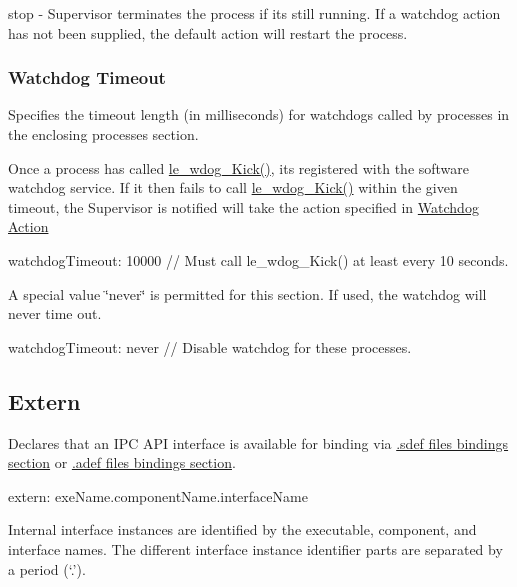 {\ttfamily stop} -\/ Supervisor terminates the process if it\textquotesingle{}s still running. If a watchdog action has not been supplied, the default action will restart the process.\hypertarget{def_files_adef_defFilesAdef_processWatchdogTimeout}{}\subsubsection{Watchdog Timeout}\label{def_files_adef_defFilesAdef_processWatchdogTimeout}
Specifies the timeout length (in milliseconds) for watchdogs called by processes in the enclosing processes section.

Once a process has called {\ttfamily \hyperlink{le__wdog__interface_8h_a43d5abc5c44309942efbe7b9c25d811f}{le\+\_\+wdog\+\_\+\+Kick()}}, it\textquotesingle{}s registered with the software watchdog service. If it then fails to call {\ttfamily \hyperlink{le__wdog__interface_8h_a43d5abc5c44309942efbe7b9c25d811f}{le\+\_\+wdog\+\_\+\+Kick()}} within the given timeout, the Supervisor is notified will take the action specified in \hyperlink{def_files_adef_defFilesAdef_processWatchdogAction}{Watchdog Action}

\begin{DoxyVerb}watchdogTimeout: 10000 // Must call le_wdog_Kick() at least every 10 seconds.
\end{DoxyVerb}


A special value \char`\"{}never\char`\"{} is permitted for this section. If used, the watchdog will never time out.

\begin{DoxyVerb}watchdogTimeout: never  // Disable watchdog for these processes.
\end{DoxyVerb}
\hypertarget{def_files_adef_defFilesAdef_extern}{}\subsection{Extern}\label{def_files_adef_defFilesAdef_extern}
Declares that an I\+P\+C A\+P\+I interface is available for binding via \hyperlink{def_files_sdef_defFilesSdef_bindings}{.sdef file\textquotesingle{}s bindings section} or \hyperlink{def_files_adef_defFilesAdef_bindings}{.adef file\textquotesingle{}s bindings section}.

\begin{DoxyVerb}extern:
{
    exeName.componentName.interfaceName
}
\end{DoxyVerb}


Internal interface instances are identified by the executable, component, and interface names. The different interface instance identifier parts are separated by a period (‘.\+’).

